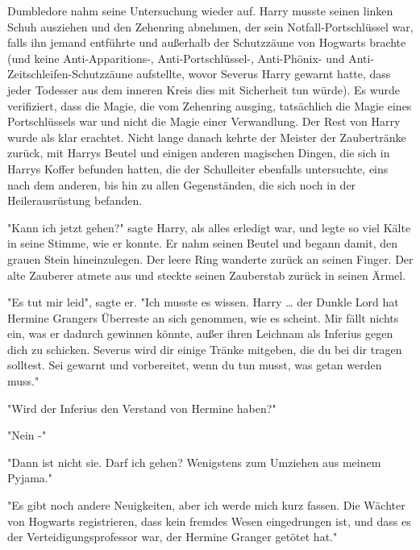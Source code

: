 {Dumbledore nahm seine Untersuchung wieder auf. Harry musste seinen linken Schuh ausziehen und den Zehenring abnehmen, der sein Notfall-Portschlüssel war, falls ihn jemand entführte und außerhalb der Schutzzäune von Hogwarts brachte (und keine Anti-Apparitions-, Anti-Portschlüssel-, Anti-Phönix- und Anti-Zeitschleifen-Schutzzäune aufstellte, wovor Severus Harry gewarnt hatte, dass jeder Todesser aus dem inneren Kreis dies mit Sicherheit tun würde). Es wurde verifiziert, dass die Magie, die vom Zehenring ausging, tatsächlich die Magie eines Portschlüssels war und nicht die Magie einer Verwandlung. Der Rest von Harry wurde als klar erachtet. Nicht lange danach kehrte der Meister der Zaubertränke zurück, mit Harrys Beutel und einigen anderen magischen Dingen, die sich in Harrys Koffer befunden hatten, die der Schulleiter ebenfalls untersuchte, eins nach dem anderen, bis hin zu allen Gegenständen, die sich noch in der Heilerausrüstung befanden.

"Kann ich jetzt gehen?" sagte Harry, als alles erledigt war, und legte so viel Kälte in seine Stimme, wie er konnte. Er nahm seinen Beutel und begann damit, den grauen Stein hineinzulegen. Der leere Ring wanderte zurück an seinen Finger. Der alte Zauberer atmete aus und steckte seinen Zauberstab zurück in seinen Ärmel.

"Es tut mir leid", sagte er. "Ich musste es wissen. Harry … der Dunkle Lord hat Hermine Grangers Überreste an sich genommen, wie es scheint. Mir fällt nichts ein, was er dadurch gewinnen könnte, außer ihren Leichnam als Inferius gegen dich zu schicken. Severus wird dir einige Tränke mitgeben, die du bei dir tragen solltest. Sei gewarnt und vorbereitet, wenn du tun musst, was getan werden muss."

"Wird der Inferius den Verstand von Hermine haben?"

"Nein -"

"Dann ist nicht sie. Darf ich gehen? Wenigstens zum Umziehen aus meinem Pyjama."

"Es gibt noch andere Neuigkeiten, aber ich werde mich kurz fassen. Die Wächter von Hogwarts registrieren, dass kein fremdes Wesen eingedrungen ist, und dass es der Verteidigungsprofessor war, der Hermine Granger getötet hat."

}
